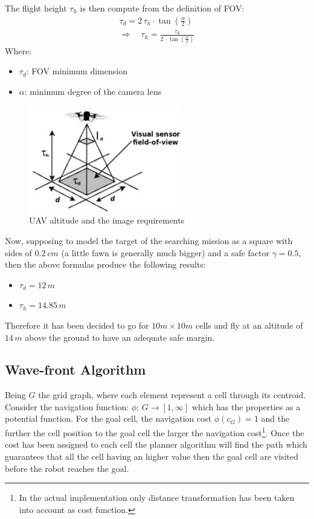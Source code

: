 The flight height $\tau_h$ is then compute from the definition of FOV:
\begin{gather*}
\tau_d = 2\,\tau_h \cdot\tan\left(\frac{\alpha}{2} \right)\\
\Rightarrow \quad \tau_h = \frac{\tau_d}{2\,\cdot\tan\left(\frac{\alpha}{2} \right)}
\end{gather*}
Where:
\begin{itemize}[noitemsep]
  \item[] $\tau_d$: FOV minimum dimension
  \item[] $\alpha$: minimum degree of the camera lens
\end{itemize}
\begin{figure}[ht]
    \centering
    \includegraphics[width=0.6\textwidth]{figures/C3/FOV.png}
    \caption{UAV altitude and the image requirements}
    \label{fig:FOV}
\end{figure}

Now, supposing to model the target of the searching mission as a square with sides of $0.2\ cm$ (a little fawn is generally much bigger) and a safe factor $\gamma = 0.5$, then the above formulas produce the following results:
\begin{itemize}[noitemsep]
  \item[] $\tau_d = 12\,m$
  \item[] $\tau_h = 14.85\, m$
\end{itemize}
Therefore it has been decided to go for $10m \times 10m$ cells and fly at an altitude of $14\,m$ above the ground to have an adequate safe margin.
\subsection{Wave-front Algorithm} %
\label{sub:wave_front_algorithm}
Being $G$ the grid graph, where each element represent a cell through its centroid.
Consider the navigation function: $\phi:\, G \rightarrow [1, \infty]$ which has the properties as a potential function. For the goal cell, the navigation cost $\phi(c_G)=1$ and the further the cell position to the goal cell the larger the navigation cost\footnote{In the actual implementation only distance transformation has been taken into account as cost function.}.
Once the cost has been assigned to each cell the planner algorithm will find the path which guarantees that all the cell having an higher value then the goal cell are visited before the robot reaches the goal.\par



